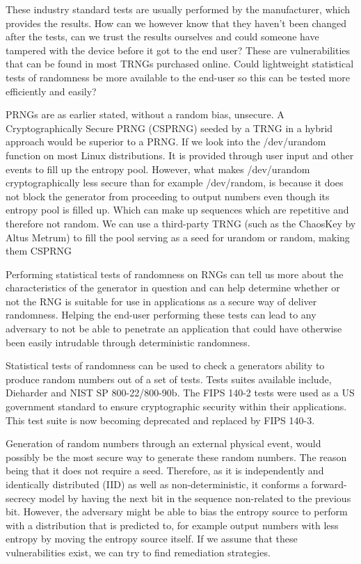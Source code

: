 \documentclass[]{final_report}
\begin{document}
\par{These industry standard tests are usually performed by the manufacturer, which provides the results. How can we however know that they haven’t been changed after the tests, can we trust the results ourselves and could someone have tampered with the device before it got to the end user? These are vulnerabilities that can be found in most TRNGs purchased online. Could lightweight statistical tests of randomness be more available to the end-user so this can be tested more efficiently and easily?}

\par{PRNGs are as earlier stated, without a random bias, unsecure. A Cryptographically Secure PRNG (CSPRNG) seeded by a TRNG in a hybrid approach would be superior to a PRNG. If we look into the /dev/urandom function on most Linux distributions. It is provided through user input and other events to fill up the entropy pool. However, what makes /dev/urandom cryptographically less secure than for example /dev/random, is because it does not block the generator from proceeding to output numbers even though its entropy pool is filled up. Which can make up sequences which are repetitive and therefore not random. We can use a third-party TRNG (such as the ChaosKey by Altus Metrum) to fill the pool serving as a seed for urandom or random, making them CSPRNG}

\par{Performing statistical tests of randomness on RNGs can tell us more about the characteristics of the generator in question and can help determine whether or not the RNG is suitable for use in applications as a secure way of deliver randomness. Helping the end-user performing these tests can lead to any adversary to not be able to penetrate an application that could have otherwise been easily intrudable through deterministic randomness.}

\par{Statistical tests of randomness can be used to check a generators ability to produce random numbers out of a set of tests. Tests suites available include, Dieharder and NIST SP 800-22/800-90b. The FIPS 140-2 tests were used as a US government standard to ensure cryptographic security within their applications. This test suite is now becoming deprecated and replaced by FIPS 140-3\cite{NIST:2019}.}

\par{Generation of random numbers through an external physical event, would possibly be the most secure way to generate these random numbers. The reason being that it does not require a seed. Therefore, as it is independently and identically distributed (IID) as well as non-deterministic, it conforms a forward-secrecy model by having the next bit in the sequence non-related to the previous bit. However, the adversary might be able to bias the entropy source to perform with a distribution that is predicted to, for example output numbers with less entropy by moving the entropy source itself. If we assume that these vulnerabilities exist, we can try to find remediation strategies.}
\end{document}
